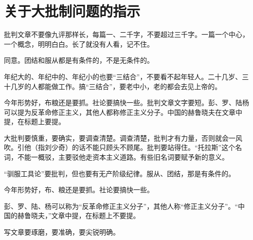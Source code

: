 \section[关于大批制问题的指示（一九六七年五月二日）]{关于大批制问题的指示}


批判文章不要像九评那样长，每篇一、二千字，不要超过三千字。一篇一个中心，一个概念，明明白白。长了就没有人看，记不住。

同意。团结和服从都是有条件的，不是无条件的。

年纪大的、年纪中的、年纪小的也要“三结合”，不要看不起年轻人。二十几岁、三十几岁的人都能做工作。搞“三结合”，要老中小，老的都会去见上帝的。

今年形势好，布粮还是要抓。社论要搞快一些。批判文章文字要短。彭、罗、陆杨可以提为反革命修正主义，其他人都称修正主义分子。中国的赫鲁晓夫在文章中提，在标题上要提。


大批判要慎重，要确实，要调查清楚。调查清楚，批判才有力量，否则就会一风吹。引他（指刘少奇）的话不能只顾头不顾尾。批判要站得住。“托拉斯”这个名词，不能一概驳，主要驳他走资本主义道路。有些旧名词要赋予新的意义。

“驯服工具论”要批判，但也要有无产阶级纪律。服从、团结，那是有条件的。

今年形势好，布、粮还是要抓。社论要搞快一些。

彭、罗、陆、杨可以称为“反革命修正主义分子”，其他人称“修正主义分子”。“中国的赫鲁晓夫，”文章中提，在标题上不要提。


写文章要琢磨，要准确，要尖锐明确。


